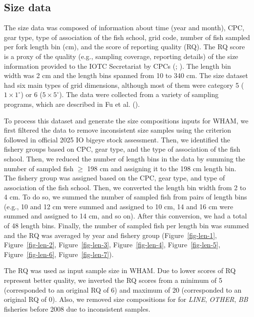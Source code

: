 \documentclass[
]{scrartcl}
\begin{document}
\subsection{Size data}\label{sec-size}

The size data was composed of information about time (year and month),
CPC, gear type, type of association of the fish school, grid code,
number of fish sampled per fork length bin (cm), and the score of
reporting quality (RQ). The RQ score is a proxy of the quality (e.g.,
sampling coverage, reporting details) of the size information provided
to the IOTC Secretariat by CPCs
(;
). The length
bin width was 2 cm and the length bins spanned from 10 to 340 cm. The
size dataset had six main types of grid dimensions, although most of
them were category 5 (\(1\times 1^\circ\)) or 6 (\(5\times 5^\circ\)).
The data were collected from a variety of sampling programs, which are
described in Fu et al.
().

To process this dataset and generate the size compositions inputs for
WHAM, we first filtered the data to remove inconsistent size samples
using the criterion followed in official 2025 IO bigeye stock
assessment. Then, we identified the fishery groups based on CPC, gear
type, and the type of association of the fish school. Then, we reduced
the number of length bins in the data by summing the number of sampled
fish \(\geq\) 198 cm and assigning it to the 198 cm length bin. The
fishery group was assigned based on the CPC, gear type, and type of
association of the fish school. Then, we converted the length bin width
from 2 to 4 cm. To do so, we summed the number of sampled fish from
pairs of length bins (e.g., 10 and 12 cm were summed and assigned to 10
cm, 14 and 16 cm were summed and assigned to 14 cm, and so on). After
this conversion, we had a total of 48 length bins. Finally, the number
of sampled fish per length bin was summed and the RQ was averaged by
year and fishery group (Figure~\ref{fig-len-1}, Figure~\ref{fig-len-2},
Figure~\ref{fig-len-3}, Figure~\ref{fig-len-4}, Figure~\ref{fig-len-5},
Figure~\ref{fig-len-6}, Figure~\ref{fig-len-7}).

The RQ was used as input sample size in WHAM. Due to lower scores of RQ
represent better quality, we inverted the RQ scores from a minimum of 5
(corresponded to an original RQ of 6) and maximum of 20 (corresponded to
an original RQ of 0). Also, we removed size compositions for for
\emph{LINE}, \emph{OTHER}, \emph{BB} fisheries before 2008 due to
inconsistent samples.
\end{document}
